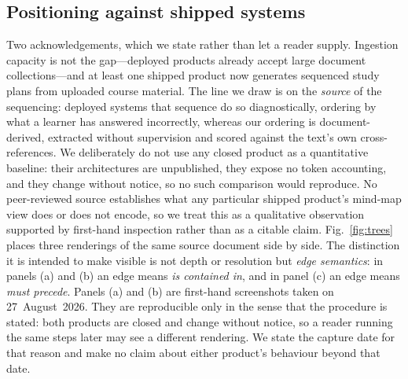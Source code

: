 \documentclass[conference]{IEEEtran}
\begin{document}
\subsection{Positioning against shipped systems}
Two acknowledgements, which we state rather than let a reader supply.
Ingestion capacity is not the gap---deployed products already accept large
document collections---and at least one shipped product now generates
sequenced study plans from uploaded course material. The line we draw is on
the \emph{source} of the sequencing: deployed systems that sequence do so
diagnostically, ordering by what a learner has answered incorrectly, whereas
our ordering is document-derived, extracted without supervision and scored
against the text's own cross-references. We deliberately do not use any
closed product as a quantitative baseline: their architectures are
unpublished, they expose no token accounting, and they change without notice,
so no such comparison would reproduce.
No peer-reviewed source establishes what any particular shipped product's
mind-map view does or does not encode, so we treat this as a qualitative
observation supported by first-hand inspection rather than as a citable claim.
Fig.~\ref{fig:trees} places three renderings of the same source document side
by side. The distinction it is intended to make visible is not depth or
resolution but \emph{edge semantics}: in panels (a) and (b) an edge means
\emph{is contained in}, and in panel (c) an edge means \emph{must precede}.
Panels (a) and (b) are first-hand screenshots taken on 27~August~2026. They
are reproducible only in the sense that the procedure is stated: both products
are closed and change without notice, so a reader running the same steps later
may see a different rendering. We state the capture date for that reason and
make no claim about either product's behaviour beyond that date.
\end{document}
